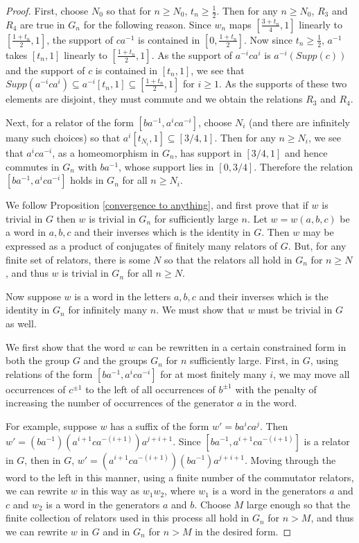 \documentclass[11pt]{amsart}
\begin{document}
\begin{proof}
First, choose $N_0$ so that for $n \geq N_0$, $t_n \geq \frac{1}{2}$. Then for any $n\geq N_0$, $R_3$ and $R_4$ are true in $G_n$ for the following reason.
Since $w_n$ maps $[\frac{3+t_n}{4},1]$ linearly to $[\frac{1+t_n}{2},1]$, the support of $ca^{-1}$ is contained in $[0, \frac{1+t_n}{2}]$.
Now since $t_n \geq \frac{1}{2}$, $a^{-1}$ takes $[t_n,1]$ linearly to $[\frac{1+t_n}{2},1]$. As the support of $a^{-i}ca^i$ is $a^{-i}(Supp(c))$ and the support of $c$ is contained in $[t_n,1]$, we see that $Supp(a^{-i}ca^i) \subseteq a^{-i}[t_n,1] \subseteq [\frac{1+t_n}{2},1]$ for $i \geq 1$. As the supports of these two elements are disjoint, they must commute and we obtain the relations $R_3$ and $R_4$.

Next, for a relator of the form $[ba^{-1}, a^i c a^{-i}]$, choose
$N_i$ (and there are infinitely many such choices) so that
$a^i[t_{N_i},1] \subseteq [3/4,1]$. Then for any $n\geq N_i$, we see that $a^i c
a^{-i}$, as a homeomorphism in
$G_n$, has support in $[3/4,1]$ and hence commutes in $G_n$ with $ba^{-1}$, whose support lies in
$[0,3/4]$.  Therefore the relation $[ba^{-1}, a^i c a^{-i}]$ holds in $G_n$ for all $n \geq N_i$.

We follow Proposition \ref{convergence to anything}, and first prove that if $w$ is trivial in $G$
then $w$ is trivial in $G_n$ for sufficiently large $n$.  Let $w=w(a,b,c)$ be a word in $a,b,c$ and their inverses which is the
identity in $G$. Then $w$ may be expressed as a product of
conjugates of finitely many relators of $G$. But, for any finite
set of relators, there is some $N$ so that the relators all hold
in $G_n$ for $n \geq N$, and thus $w$ is trivial in $G_n$ for
all $n \geq N$.

Now suppose $w$ is a word in the letters $a, b,c$ and their
inverses which is the identity in $G_n$ for infinitely many $n$. We must show that $w$ must be trivial in $G$ as well.

We first show that the word $w$ can be rewritten in a certain constrained form in both the group $G$ and the groups $G_n$ for $n$ sufficiently large.
First, in $G$, using  relations of the form $[ba^{-1},
a^i c a^{-i}]$ for at most finitely many $i$, we may move all occurrences of $c^{\pm 1}$ to the left of
all occurrences of $b^{\pm 1}$ with the penalty of increasing the number of occurrences of the
generator $a$ in the word.

For example, suppose $w$ has a suffix of the form $w'=ba^ica^j$. Then $w'=(ba^{-1})(a^{i+1}ca^{-(i+1)})a^{j+i+1}$. Since $[ba^{-1},a^{i+1}ca^{-(i+1)}]$ is a relator in $G$, then in $G$, $w'=(a^{i+1}ca^{-(i+1)})(ba^{-1})a^{j+i+1}$. Moving through the word to the left in this manner, using a finite number of the commutator relators,
we can rewrite $w$ in this way as $w_1w_2$, where $w_1$
is a word in the generators $a$ and $c$ and $w_2$ is a word in the generators $a$ and $b$.
Choose $M$ large enough so that the finite collection of relators used in this process all hold in $G_n$ for $n > M$, and thus we can
rewrite $w$ in $G$ and in $G_n$  for $n>M$ in the desired form.


\end{proof}
\end{document}
